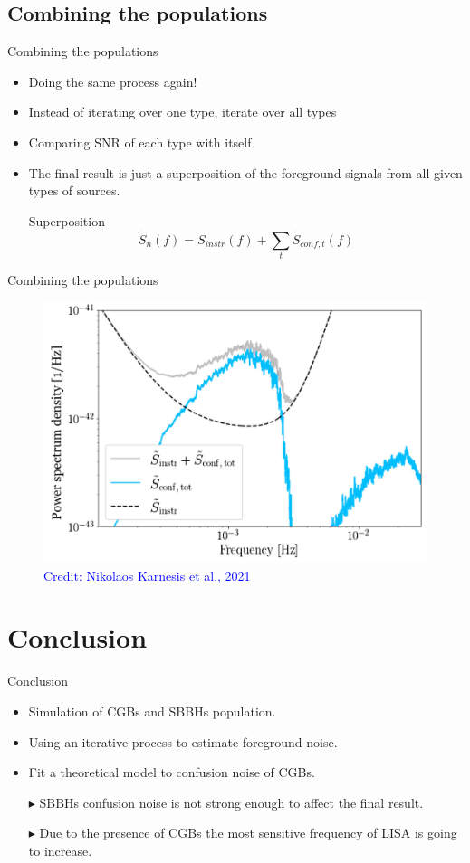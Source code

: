 \documentclass[pdf]{beamer}
\newcommand{\credit}[1]{\tiny{\textcolor{blue}{Credit: #1}}}
\begin{document}
\subsection{Combining the populations}
\begin{frame}{Combining the populations}
\begin{itemize}
\item Doing the same process again!
\item Instead of iterating over one type, iterate over all types
\item Comparing SNR of each type with itself
\item The final result is just a superposition of the foreground signals from all given types of sources.
\begin{block}{Superposition}
\begin{equation*}
\tilde{S}_n(f) = \tilde{S}_{instr}(f) +\sum_t \tilde{S}_{conf,t}(f)
\end{equation*}
\end{block}
\end{itemize}
\end{frame}

\begin{frame}{Combining the populations}
\begin{figure}
\includegraphics[width=.8\textwidth]{fig/combin.png}
\caption*{\credit{Nikolaos Karnesis et al., 2021}}
\end{figure}
\end{frame}


\section{Conclusion}
\begin{frame}{Conclusion}
\begin{itemize}
\item Simulation of CGBs and SBBHs population.
\item Using an iterative process to estimate foreground noise.
\item Fit a theoretical model to confusion noise of CGBs.
\item[$\blacktriangleright$] SBBHs confusion noise is not strong enough to affect the final result.
\item[$\blacktriangleright$] Due to the presence of CGBs the most sensitive frequency of LISA is going to increase.
\end{itemize}
\end{frame}
\end{document}
